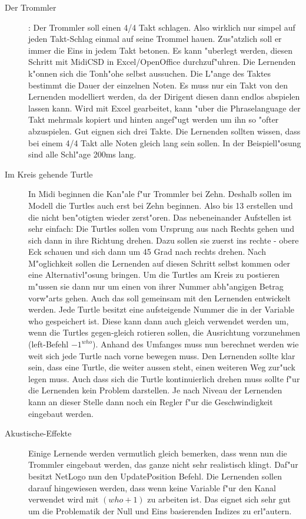 \begin{description}
\item[Der Trommler]: Der Trommler soll einen 4/4 Takt schlagen. Also wirklich
nur simpel auf jeden Takt-Schlag einmal auf seine Trommel hauen. Zus"atzlich
soll er immer die Eins in jedem Takt betonen. Es kann "uberlegt werden, diesen
Schritt mit MidiCSD\cite{MidiCSD} in Excel/OpenOffice durchzuf"uhren. Die
Lernenden k"onnen sich die Tonh"ohe selbst aussuchen. Die L"ange des Taktes
bestimmt die Dauer der einzelnen Noten. Es muss nur ein Takt von den Lernenden
modelliert werden, da der Dirigent diesen dann endlos abspielen lassen kann.
Wird mit Excel gearbeitet, kann "uber die Phraselanguage der Takt 
mehrmals kopiert und hinten angef"ugt werden um ihn so "ofter abzuspielen.
Gut eignen sich drei Takte. Die Lernenden sollten wissen, dass bei einem 4/4
Takt alle Noten gleich lang sein sollen. In der Beispiell"osung sind alle
Schl"age 200ms lang. 
\item[Im Kreis gehende Turtle] In Midi beginnen die Kan"ale f"ur Trommler bei
Zehn. Deshalb sollen im Modell die Turtles auch erst bei Zehn beginnen. Also
bis 13 erstellen und die nicht ben"otigten wieder zerst"oren. Das nebeneinander
Aufstellen ist sehr einfach: Die Turtles sollen vom Ursprung aus nach Rechts
gehen und sich dann in ihre Richtung drehen. Dazu sollen sie zuerst ins
rechte - obere Eck schauen und sich dann um 45 Grad nach rechts drehen. Nach
M"oglichkeit sollen die Lernenden auf diesen Schritt selbst kommen oder eine
Alternativl"osung bringen. Um die Turtles am Kreis zu postieren m"ussen sie
dann nur um einen von ihrer Nummer abh"angigen Betrag vorw"arts gehen. Auch
das soll gemeinsam mit den Lernenden entwickelt werden. Jede Turtle besitzt
eine aufsteigende Nummer die in der Variable who gespeichert ist. Diese kann
dann auch gleich verwendet werden um, wenn die Turtles gegen-gleich rotieren
sollen, die Ausrichtung vorzunehmen (left-Befehl $-1^{who}$). Anhand des
Umfanges muss nun berechnet werden wie weit sich jede Turtle nach vorne 
bewegen muss. Den Lernenden sollte klar sein, dass eine Turtle, die weiter 
aussen steht, einen weiteren Weg zur"uck legen muss. Auch dass sich die
Turtle kontinuierlich drehen muss sollte f"ur die Lernenden kein Problem 
darstellen. 
Je nach Niveau der Lernenden kann an dieser Stelle dann noch ein Regler f"ur die 
Geschwindigkeit eingebaut werden. 
\item[Akustische-Effekte] Einige Lernende werden vermutlich gleich bemerken,
dass wenn nun die Trommler eingebaut werden, das ganze nicht sehr realistisch
klingt. Daf"ur besitzt NetLogo nun den UpdatePosition Befehl. Die Lernenden
sollen darauf hingewiesen werden, dass wenn keine Variable f"ur den Kanal
verwendet wird mit $(who + 1)$ zu arbeiten ist. Das eignet sich sehr gut
um die Problematik der Null und Eins basierenden Indizes zu erl"autern. 

\end{description}



